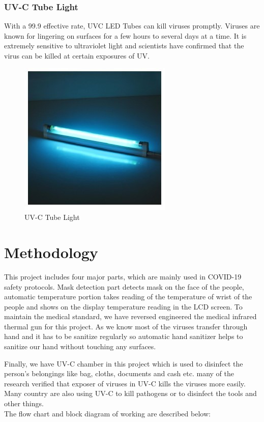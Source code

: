 \documentclass[a4paper,12pt]{report}
\begin{document}
\subsection{UV-C Tube Light}
With a 99.9 effective rate, UVC LED Tubes can kill viruses promptly. Viruses are known
for lingering on surfaces for a few hours to several days at a time. It is extremely sensitive
to ultraviolet light and scientists have confirmed that the virus can be killed at certain
exposures of UV.
\begin{figure}[h] %
   \begin{center}
   \includegraphics[scale=0.6]{uv c.jpg}
   \caption{UV-C Tube Light}
  \end{center}
  \end{figure}
\chapter{Methodology}
This project includes four major parts, which are mainly used in COVID-19 safety protocols.
Mask detection part detects mask on the face of the people, automatic temperature portion
takes reading of the temperature of wrist of the people and shows on the display temperature
reading in the LCD screen. To maintain the medical standard, we have reversed engineered
the medical infrared thermal gun for this project. As we know most of the viruses transfer
through hand and it has to be sanitize regularly so automatic hand sanitizer helps to sanitize
our hand without touching any surfaces.

Finally, we have UV-C chamber in this project which is used to disinfect the person’s belongings like bag, cloths, documents and cash etc. many of the research verified that exposer
of viruses in UV-C kills the viruses more easily. Many country are also using 
UV-C to kill pathogens or to disinfect the tools and other things.\\
The flow chart and block diagram of working are described below:
\end{document}
